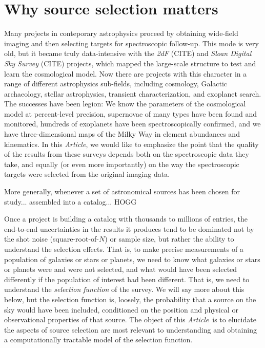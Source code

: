 \documentclass[modern]{aastex62}
\newcommand{\documentname}{\textsl{Article}}
\newcommand{\project}[1]{\textsl{#1}}
\begin{document}

\section{Why source selection matters}

Many projects in conteporary astrophysics proceed by obtaining
wide-field imaging and then selecting targets for spectroscopic
follow-up.
This mode is very old, but it became truly data-intensive with
the \project{2dF} (CITE) and \project{Sloan Digital Sky Survey} (CITE)
projects, which mapped the large-scale structure to test and learn the
cosmological model.
Now there are projects with this character in a range of different
astrophysics sub-fields, including cosmology, Galactic archaeology,
stellar astrophysics, transient characterization, and exoplanet search.
The successes have been legion:
We know the parameters of the cosmological model at percent-level
precision, supernovae of many types have been found and monitored,
hundreds of exoplanets have been spectroscopically confirmed,
and we have three-dimensional maps of the Milky Way in
element abundances and kinematics.
In this \documentname, we would like to emphasize the point that the
quality of the results from these surveys depends both on the
spectroscopic data they take, and equally (or even more importantly)
on the way the spectroscopic targets were selected from the original
imaging data.

More generally, whenever a set of astronomical sources has been chosen
for study... assembled into a catalog... HOGG

Once a project is building a catalog with thousands to millions of entries, the
end-to-end uncertainties in the results it produces tend to be
dominated not by the shot noise (square-root-of-$N$) or sample size,
but rather the ability to understand the selection effects.
That is, to make precise measurements of a population of galaxies or
stars or planets, we need to know what galaxies or stars or planets
were and were not selected, and what would
have been selected differently if the population of interest had been
different.
That is, we need to understand the \emph{selection function} of the
survey.
We will say more about this below, but the selection function is,
loosely, the probability that a source on the sky would have been
included, conditioned on the
position and physical or observational properties of that source.
The object of this \documentname\ is to elucidate the aspects of
source selection are most relevant to understanding and obtaining a
computationally tractable model of the selection function.
\end{document}
